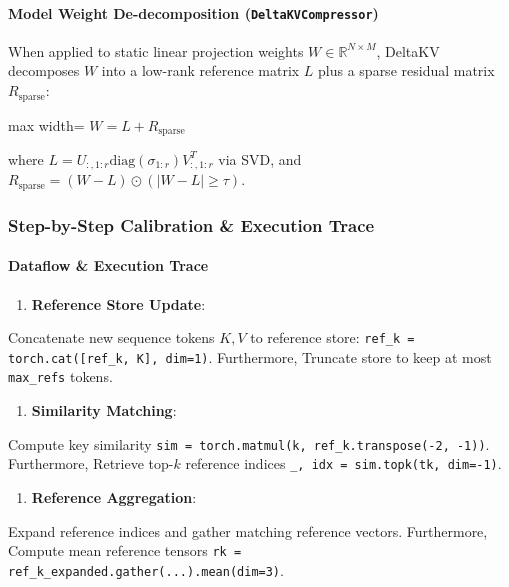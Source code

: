 \paragraph{Model Weight De-decomposition (\texttt{DeltaKVCompressor})}

When applied to static linear projection weights $W \in \mathbb{R}^{N \times M}$, DeltaKV decomposes $W$ into a low-rank reference matrix $L$ plus a sparse residual matrix $R_{\text{sparse}}$:

\begin{center}
\begin{adjustbox}{max width=\columnwidth}
$\displaystyle
W = L + R_{\text{sparse}}
$
\end{adjustbox}
\end{center}

where $L = U_{:, 1:r} \text{diag}(\sigma_{1:r}) V_{:, 1:r}^T$ via SVD, and $R_{\text{sparse}} = (W - L) \odot (|W - L| \ge \tau)$.


\subsubsection*{Step-by-Step Calibration \& Execution Trace}

\paragraph{Dataflow \& Execution Trace}

\begin{enumerate}
\item \textbf{Reference Store Update}:
\end{enumerate}
Concatenate new sequence tokens $K, V$ to reference store: \texttt{ref\_k = torch.cat([ref\_k, K], dim=1)}. Furthermore, Truncate store to keep at most \texttt{max\_refs} tokens.

\begin{enumerate}
\item \textbf{Similarity Matching}:
\end{enumerate}
Compute key similarity \texttt{sim = torch.matmul(k, ref\_k.transpose(-2, -1))}. Furthermore, Retrieve top-$k$ reference indices \texttt{\_, idx = sim.topk(tk, dim=-1)}.

\begin{enumerate}
\item \textbf{Reference Aggregation}:
\end{enumerate}
Expand reference indices and gather matching reference vectors. Furthermore, Compute mean reference tensors \texttt{rk = ref\_k\_expanded.gather(...).mean(dim=3)}.

